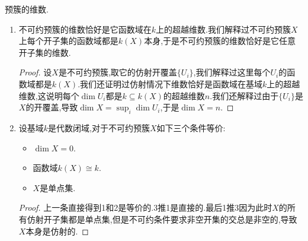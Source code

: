 预簇的维数.
\begin{enumerate}
	\item 不可约预簇的维数恰好是它函数域在$k$上的超越维数.我们解释过不可约预簇$X$上每个开子集的函数域都是$k(X)$本身,于是不可约预簇的维数恰好是它任意开子集的维数.
	\begin{proof}
		
		设$X$是不可约预簇,取它的仿射开覆盖$\{U_i\}$,我们解释过这里每个$U_i$的函数域都是$k(X)$.我们还证明过仿射情况下维数恰好是函数域在基域$k$上的超越维数,这说明每个$\dim U_i$都是$k\subseteq k(X)$的超越维数$n$.我们还解释过由于$\{U_i\}$是$X$的开覆盖,导致$\dim X=\sup_i\dim U_i$,于是$\dim X=n$.
	\end{proof}
	\item 设基域$k$是代数闭域,对于不可约预簇$X$如下三个条件等价:
	\begin{itemize}
		\item $\dim X=0$.
		\item 函数域$k(X)\cong k$.
		\item $X$是单点集.
	\end{itemize}
	\begin{proof}
		
		上一条直接得到1和2是等价的.3推1是直接的.最后1推3因为此时$X$的所有仿射开子集都是单点集,但是不可约条件要求非空开集的交总是非空的,导致$X$本身是仿射的.
	\end{proof}
\end{enumerate}

